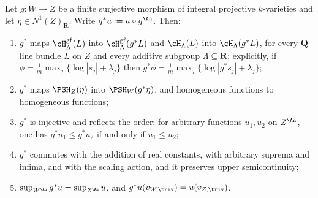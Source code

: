 \begin{proposition}
\label{prop:ch41-finite-pullback}
Let $g:W\to Z$ be a finite surjective morphism of integral projective
$k$-varieties and let $\eta\in N^1(Z)_{\mathbf R}$.  Write
$g^*u:=u\circ g^{\An}$.  Then:
\begin{enumerate}
\item\label{itm:ch41-pb:fs}
      $g^*$ maps $\cH^{\mathrm{gf}}_\Lambda(L)$ into
      $\cH^{\mathrm{gf}}_\Lambda(g^*L)$ and $\cH_\Lambda(L)$ into
      $\cH_\Lambda(g^*L)$, for every $\mathbf Q$-line bundle $L$ on
      $Z$ and every additive subgroup
      $\Lambda\subseteq\mathbf R$; explicitly, if
      $\phi=\frac1m\max_j\{\log|s_j|+\lambda_j\}$ then
      $g^*\phi=\frac1m\max_j\{\log|g^*s_j|+\lambda_j\}$;
\item\label{itm:ch41-pb:psh}
      $g^*$ maps $\PSH_Z(\eta)$ into $\PSH_W(g^*\eta)$, and
      homogeneous functions to homogeneous functions;
\item\label{itm:ch41-pb:order}
      $g^*$ is injective and reflects the order: for arbitrary functions
      $u_1,u_2$ on $Z^{\An}$, one has $g^*u_1\le g^*u_2$ if and only
      if $u_1\le u_2$;
\item\label{itm:ch41-pb:ops}
      $g^*$ commutes with the addition of real constants, with arbitrary
      suprema and infima, and with the scaling action, and it preserves
      upper semicontinuity;
\item\label{itm:ch41-pb:sup}
      $\sup_{W^{\An}}g^*u=\sup_{Z^{\An}}u$, and
      $g^*u(v_{W,\triv})=u(v_{Z,\triv})$.
\end{enumerate}
\end{proposition}

